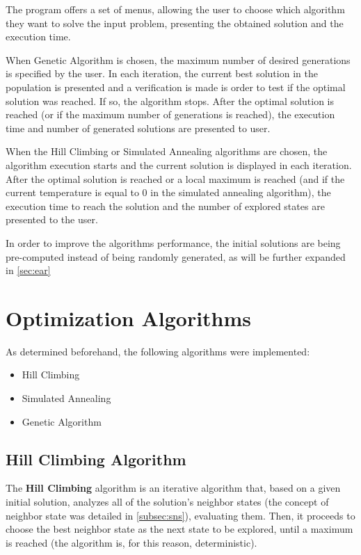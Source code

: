 \documentclass[conference]{IEEEtran}
\begin{document}
The program offers a set of menus, allowing the user to choose which algorithm they want to solve the input problem, presenting the obtained solution and the execution time. 

When Genetic Algorithm is chosen, the maximum number of desired generations is specified by the user. In each iteration, the current best solution in the population is presented and a verification is made is order to test if the optimal solution was reached. If so, the algorithm stops. After the optimal solution is reached (or if the maximum number of generations is reached), the execution time and number of generated solutions are presented to user.

When the Hill Climbing or Simulated Annealing algorithms are chosen, the algorithm execution starts and the current solution is displayed in each iteration. After the optimal solution is reached or a local maximum is reached (and if the current temperature is equal to 0 in the simulated annealing algorithm), the execution time to reach the solution and the number of explored states are presented to the user.

In order to improve the algorithms performance, the initial solutions are being pre-computed instead of being randomly generated, as will be further expanded in \autoref{sec:ear}

\section{Optimization Algorithms}

As determined beforehand, the following algorithms were implemented:
\begin{itemize}
    \item Hill Climbing
    \item Simulated Annealing
    \item Genetic Algorithm
\end{itemize}

\subsection{Hill Climbing Algorithm} \label{subsec:hca}

The \textbf{Hill Climbing} algorithm is an iterative algorithm that, based on a given initial solution, analyzes all of the solution's neighbor states (the concept of neighbor state was detailed in \autoref{subsec:sns}), evaluating them. Then, it proceeds to choose the best neighbor state as the next state to be explored, until a maximum is reached (the algorithm is, for this reason, deterministic).
\end{document}
